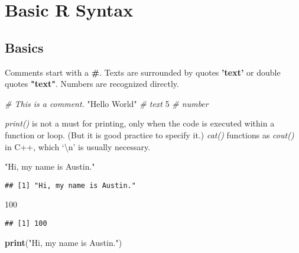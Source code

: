 \documentclass[
  12pt,
]{article}
\newenvironment{Shaded}{\begin{snugshade}}{\end{snugshade}}
\newcommand{\CommentTok}[1]{\textcolor[rgb]{0.56,0.35,0.01}{\textit{#1}}}
\newcommand{\DecValTok}[1]{\textcolor[rgb]{0.00,0.00,0.81}{#1}}
\newcommand{\FunctionTok}[1]{\textcolor[rgb]{0.13,0.29,0.53}{\textbf{#1}}}
\newcommand{\NormalTok}[1]{#1}
\newcommand{\StringTok}[1]{\textcolor[rgb]{0.31,0.60,0.02}{#1}}
\begin{document}
\newpage
\section{Basic R Syntax}
\label{sec:BRS}
\subsection{Basics}
\label{sec:BRS-basics}

Comments start with a \textbf{\#}. Texts are surrounded by quotes
\textbf{'text'} or double quotes \textbf{"text"}. Numbers are recognized
directly.

\begin{Shaded}
\begin{Highlighting}[]
\CommentTok{\# This is a comment.}
\StringTok{"Hello World"}  \CommentTok{\# text}
\DecValTok{5}  \CommentTok{\# number}
\end{Highlighting}
\end{Shaded}

\textit{print()} is not a must for printing, only when the code is
executed within a function or loop. (But it is good practice to specify
it.) \textit{cat()} functions as \textit{cout()} in C++, which
`\textbackslash n' is usually necessary.

\begin{Shaded}
\begin{Highlighting}[]
\StringTok{"Hi, my name is Austin."}
\end{Highlighting}
\end{Shaded}

\begin{verbatim}
## [1] "Hi, my name is Austin."
\end{verbatim}

\begin{Shaded}
\begin{Highlighting}[]
\DecValTok{100}
\end{Highlighting}
\end{Shaded}

\begin{verbatim}
## [1] 100
\end{verbatim}

\begin{Shaded}
\begin{Highlighting}[]
\FunctionTok{print}\NormalTok{(}\StringTok{"Hi, my name is Austin."}\NormalTok{)}
\end{Highlighting}
\end{Shaded}
\end{document}
